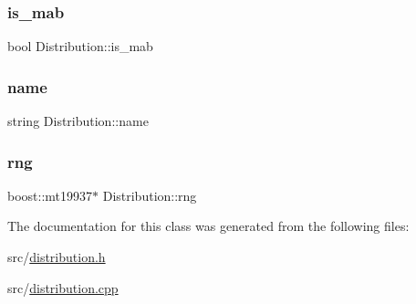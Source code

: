 \subsubsection{\texorpdfstring{is\+\_\+mab}{is\_mab}}
{\footnotesize\ttfamily bool Distribution\+::is\+\_\+mab}

\mbox{\label{class_distribution_ab3b7be02f0401cb76beb2e744b6161f9}} 
\subsubsection{\texorpdfstring{name}{name}}
{\footnotesize\ttfamily string Distribution\+::name}

\mbox{\label{class_distribution_ac8915a45ce85ab6b7506fa42bb850a89}} 
\subsubsection{\texorpdfstring{rng}{rng}}
{\footnotesize\ttfamily boost\+::mt19937$\ast$ Distribution\+::rng\hspace{0.3cm}{\ttfamily [protected]}}



The documentation for this class was generated from the following files\+:\begin{DoxyCompactItemize}
\item 
src/\mbox{\hyperlink{distribution_8h}{distribution.\+h}}\item 
src/\mbox{\hyperlink{distribution_8cpp}{distribution.\+cpp}}\end{DoxyCompactItemize}
